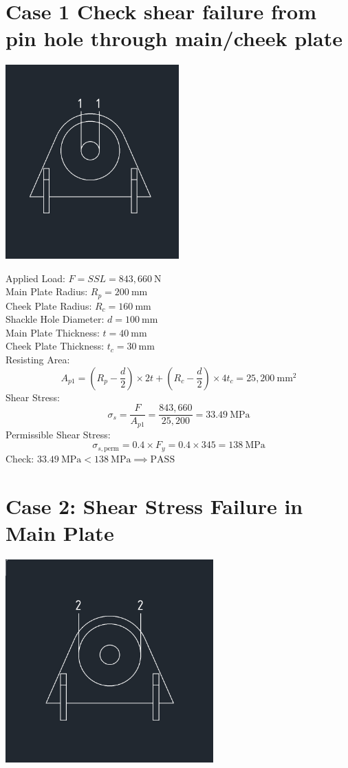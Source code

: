 \documentclass[12pt]{article}
\begin{document}
\section{Case 1 Check shear failure from pin hole through main/cheek plate}
\begin{center}
\includegraphics[width=0.5\textwidth]{image-2.png}
\end{center}
Applied Load: $F = SSL = 843,660\ \mathrm{N}$\\
Main Plate Radius: $R_p = 200\ \mathrm{mm}$\\
Cheek Plate Radius: $R_c = 160\ \mathrm{mm}$\\
Shackle Hole Diameter: $d = 100\ \mathrm{mm}$\\
Main Plate Thickness: $t = 40\ \mathrm{mm}$\\
Cheek Plate Thickness: $t_c = 30\ \mathrm{mm}$\\
Resisting Area:
\[
A_{p1} = (R_p - \frac{d}{2}) \times 2t + (R_c - \frac{d}{2}) \times 4t_c = 25,200\ \mathrm{mm}^2
\]
Shear Stress:
\[
\sigma_s = \frac{F}{A_{p1}} = \frac{843,660}{25,200} = 33.49\ \mathrm{MPa}
\]
Permissible Shear Stress:
\[
\sigma_{s,\text{perm}} = 0.4 \times F_y = 0.4 \times 345 = 138\ \mathrm{MPa}
\]
Check: $33.49\ \mathrm{MPa} < 138\ \mathrm{MPa} \implies \text{PASS}$

\section{Case 2: Shear Stress Failure in Main Plate}
\begin{center}
\includegraphics[width=0.6\textwidth]{Case2.png}
\end{center}
\end{document}
